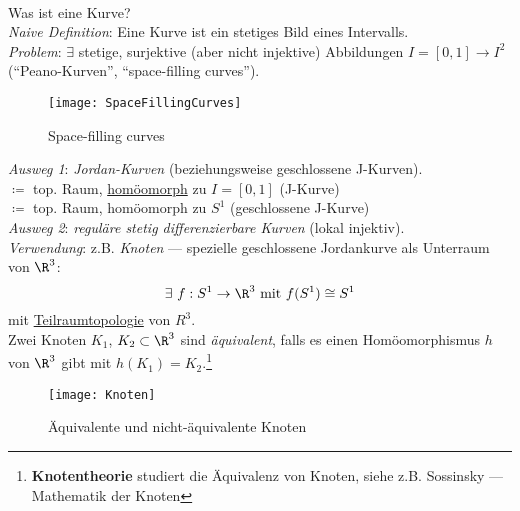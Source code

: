 \begin{remark}\label{exkurs:kurve}
  \  \\
  \begin{minipage}{.45\textwidth}
    \vspace{0.1cm}
    Was ist eine Kurve? \\
    \emph{Naive Definition}: Eine Kurve ist ein stetiges Bild eines Intervalls. \\
    \emph{Problem}: \( \exists \) stetige, surjektive (aber nicht injektive) Abbildungen \( I = [0,1] \to I^2 \) (``Peano-Kurven'', ``space-filling curves'')\footnotemark.
    \vspace{0.1cm}
  \end{minipage}
  \hfill
  \begin{minipage}{.45\textwidth}
    \vspace{0.1cm}  
    \begin{figure}[H]
      \texttt{[image: SpaceFillingCurves]}
      \caption{Space-filling curves}
    \end{figure}
    \vspace{0.1cm}
  \end{minipage}
  \emph{Ausweg 1}: \emph{Jordan-Kurven} (beziehungsweise geschlossene J-Kurven). \\
    \( \coloneqq \) top. Raum, \hyperref[def:homoeomorphismus]{homöomorph} zu \( I = [0,1] \) (J-Kurve) \\
    \( \coloneqq \) top. Raum, homöomorph zu \( S^1 \) (geschlossene J-Kurve) \\
  \emph{Ausweg 2}: \emph{reguläre stetig differenzierbare Kurven} (lokal injektiv). \\
  \emph{Verwendung}: z.B. \emph{Knoten} --- spezielle geschlossene Jordankurve als Unterraum von \( \R^3 \):
  \begin{equation*}
    \exists \ f : S^1 \to \R^3 \text{ mit } f(S^1) \cong S^1
  \end{equation*}
  mit \hyperref[def:teilraumtopologie]{Teilraumtopologie} von \( R^3 \). \\
  Zwei Knoten \( K_1 \), \( K_2 \subset \R^3 \) sind \emph{äquivalent}, falls es einen Homöomorphismus \( h \) von \( \R^3 \) gibt mit \( h(K_1) = K_2 \).\footnote{\textbf{Knotentheorie} studiert die Äquivalenz von Knoten, siehe z.B. Sossinsky --- Mathematik der Knoten}
  \begin{figure}[H]
    \texttt{[image: Knoten]}
    \caption{Äquivalente und nicht-äquivalente Knoten}
  \end{figure}
\end{remark}

